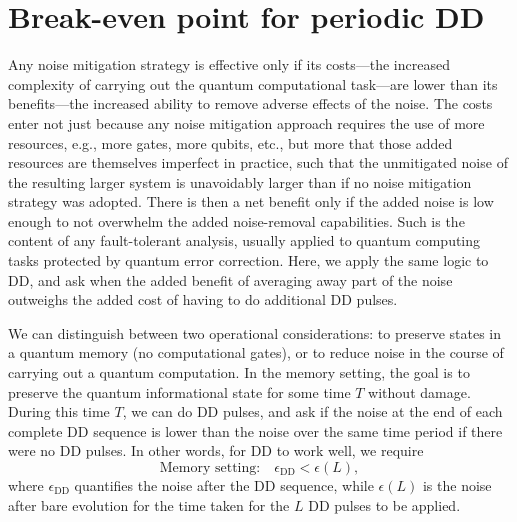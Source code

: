 \documentclass[twocolumn,pra,superscriptaddress]{revtex4-2}
\begin{document}
\section{Break-even point for periodic DD}
Any noise mitigation strategy is effective only if its costs---the increased complexity of carrying out the quantum computational task---are lower than its benefits---the increased ability to remove adverse effects of the noise. The costs enter not just because any noise mitigation approach requires the use of more resources, e.g., more gates, more qubits, etc., but more that those added resources are themselves imperfect in practice, such that the unmitigated noise of the resulting larger system is unavoidably larger than if no noise mitigation strategy was adopted. There is then a net benefit only if the added noise is low enough to not overwhelm the added noise-removal capabilities. Such is the content of any fault-tolerant analysis, usually applied to quantum computing tasks protected by quantum error correction. Here, we apply the same logic to DD, and ask when the added benefit of averaging away part of the noise outweighs the added cost of having to do additional DD pulses.

We can distinguish between two operational considerations: to preserve states in a quantum memory (no computational gates), or to reduce noise in the course of carrying out a quantum computation. In the memory setting, the goal is to preserve the quantum informational state for some time $T$ without damage. During this time $T$, we can do DD pulses, and ask if the noise at the end of each complete DD sequence is lower than the noise over the same time period if there were no DD pulses. In other words, for DD to work well, we require
\begin{equation}
\textrm{Memory setting:}\quad \epsilon_\mathrm{DD}<\epsilon(L),
\end{equation}
where $\epsilon_\mathrm{DD}$ quantifies the noise after the DD sequence, while $\epsilon(L)$ is the noise after bare evolution for the time taken for the $L$ DD pulses to be applied.
\end{document}
